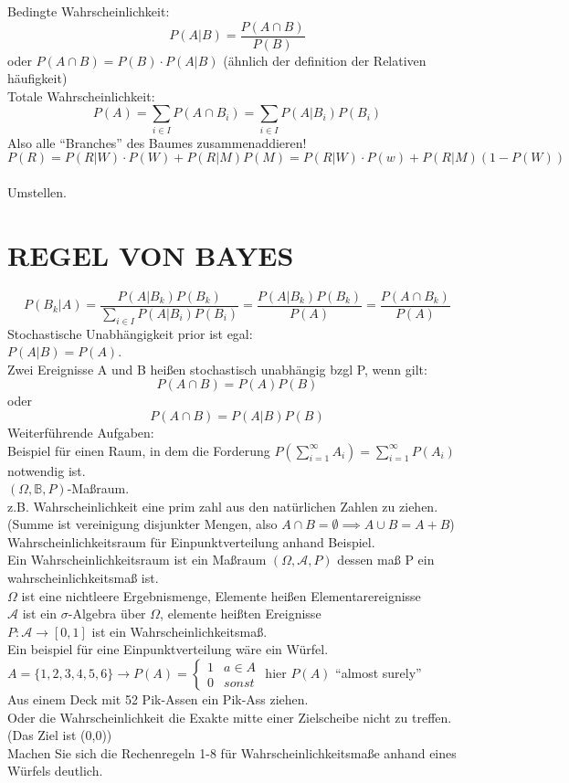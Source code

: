 \documentclass{article}
\begin{document}
	Bedingte Wahrscheinlichkeit:\\
	\[P(A|B) = \frac{P(A\cap B)}{P(B)}\]
	oder $P(A\cap B) = P(B)\cdot P(A|B)$ (ähnlich der definition der Relativen häufigkeit)\\
	Totale Wahrscheinlichkeit:\\
	\[P(A)=\sum_{i\in I} P(A\cap B_i)=\sum_{i\in I}P(A|B_i)P(B_i)\]
	Also alle ``Branches'' des Baumes zusammenaddieren!\\
	\[P(R)=P(R|W)\cdot P(W)+P(R|M)P(M) = P(R|W)\cdot P(w)+P(R|M)(1-P(W))\]\\
	Umstellen.\\
	\section{REGEL VON BAYES}
	\[P(B_k|A)=\frac{P(A|B_k)P(B_k)}{\sum_{i\in I}P(A|B_i)P(B_i)} = \frac{P(A|B_k)P(B_k)}{P(A)}=\frac{P(A\cap B_k)}{P(A)}\]
	Stochastische Unabhängigkeit prior ist egal:\\
	$P(A|B)=P(A)$.\\
	Zwei Ereignisse A und B heißen stochastisch unabhängig bzgl P, wenn gilt:
	\[P(A\cap B)=P(A)P(B)\]
	oder
	\[P(A\cap B)=P(A|B)P(B)\]
	Weiterführende Aufgaben:\\
	Beispiel für einen Raum, in dem die Forderung $P(\sum\limits^\infty_{i=1}A_i)=\sum\limits^\infty_{i=1}P(A_i)$ notwendig ist.\\
	$(\Omega,\mathbb{B}, P)$-Maßraum.\\
	z.B. Wahrscheinlichkeit eine prim zahl aus den natürlichen Zahlen zu ziehen.\\
	(Summe ist vereinigung disjunkter Mengen, also $A\cap B=\emptyset \implies A\cup B=A+B$)\\
	Wahrscheinlichkeitsraum für Einpunktverteilung anhand Beispiel.\\
	Ein Wahrscheinlichkeitsraum ist ein Maßraum $(\Omega,\mathcal{A},P)$ dessen maß P ein wahrscheinlichkeitsmaß ist.\\
	$\Omega$ ist eine nichtleere Ergebnismenge, Elemente heißen Elementarereignisse\\
	$\mathcal{A}$ ist ein $\sigma$-Algebra über $\Omega$, elemente heißten Ereignisse\\
	$P:\mathcal{A}\to [0,1]$ ist ein Wahrscheinlichkeitsmaß.\\
	Ein beispiel für eine Einpunktverteilung wäre ein Würfel.\\
	$A=\{1,2,3,4,5,6\}\to P(A)=\begin{cases} 1&a\in A\\0&sonst\end{cases}$ hier $P(A)$ ``almost surely''\\
	Aus einem Deck mit 52 Pik-Assen ein Pik-Ass ziehen.\\
	Oder die Wahrscheinlichkeit die Exakte mitte einer Zielscheibe nicht zu treffen.\\
	(Das Ziel ist (0,0))\\
	Machen Sie sich die Rechenregeln 1-8 für Wahrscheinlichkeitsmaße
	anhand eines Würfels deutlich.
\end{document}
